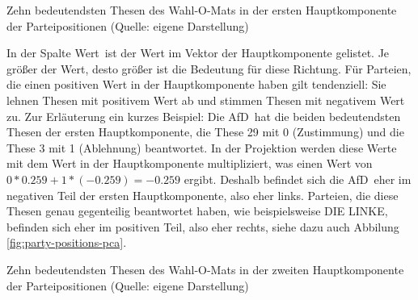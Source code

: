 \begin{table}[htb]
	\centering
	\caption{Zehn bedeutendsten Thesen des Wahl-O-Mats \citep{WahlOMat} in der ersten Hauptkomponente der Parteipositionen (Quelle: eigene Darstellung)}
	\label{tab:pca1}
\end{table}

In der Spalte \glqq Wert\grqq\ ist der Wert im Vektor der Hauptkomponente gelistet. Je größer der Wert, desto größer ist die Bedeutung für diese Richtung.
Für Parteien, die einen positiven Wert in der Hauptkomponente haben gilt tendenziell: Sie lehnen Thesen mit positivem Wert ab und stimmen Thesen mit negativem Wert zu.
Zur Erläuterung ein kurzes Beispiel: Die \glqq AfD\grqq\ hat die beiden bedeutendsten Thesen der ersten Hauptkomponente, die These 29 mit 0 (Zustimmung) und die These 3 mit 1 (Ablehnung) beantwortet. In der Projektion werden diese Werte mit dem Wert in der Hauptkomponente multipliziert, was einen Wert von $0*0.259+1*(-0.259)=-0.259$ ergibt. Deshalb befindet sich die \glqq AfD\grqq\ eher im negativen Teil der ersten Hauptkomponente, also eher links. Parteien, die diese Thesen genau gegenteilig beantwortet haben, wie beispielsweise \glqq DIE LINKE\grqq , befinden sich eher im positiven Teil, also eher rechts, siehe dazu auch Abbilung \ref{fig:party-positions-pca}.

\begin{table}%
	\centering
\caption{Zehn bedeutendsten Thesen des Wahl-O-Mats \citep{WahlOMat} in der zweiten Hauptkomponente der Parteipositionen (Quelle: eigene Darstellung)}
	\label{tab:pca2}
\end{table}

